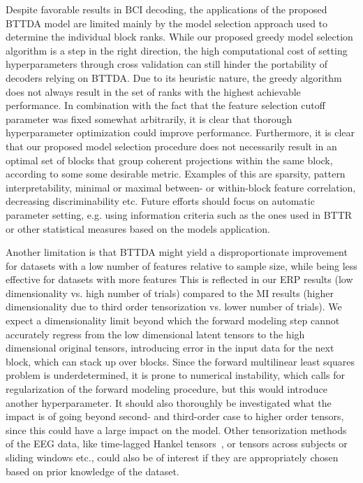 Despite favorable results in BCI decoding, the applications of the proposed
BTTDA model are limited mainly by the model selection approach used
to determine the individual block ranks.
While our proposed greedy model selection algorithm is a step in the right
direction, the high computational cost of setting hyperparameters through cross
validation can still hinder the portability of decoders relying on
BTTDA.
Due to its heuristic nature, the greedy algorithm does not always result in the
set of ranks with the highest achievable performance.
In combination with the fact that the feature selection cutoff parameter was
fixed somewhat arbitrarily, it is clear that thorough
hyperparameter optimization could improve performance.
Furthermore, it is clear that our proposed model selection procedure does not
necessarily result in an optimal set of blocks that group coherent projections
within the same block, according to some some desirable metric.
Examples of this are sparsity, pattern interpretability, minimal or maximal between- or within-block feature
correlation, decreasing discriminability etc.
Future efforts should focus on automatic parameter setting, e.g. using
information criteria such as the ones used in BTTR~\cite{Faes2022} or other
statistical measures based on the models application.

Another limitation is that BTTDA might yield a disproportionate
improvement for datasets with a low number of features relative to sample size,
while being less effective for datasets with more features
This is reflected
in our ERP results (low dimensionality vs. high number of trials) compared to the
MI results (higher dimensionality due to third order tensorization vs. lower
number of trials).
We expect a dimensionality limit beyond which the forward modeling step cannot
accurately regress from the low dimensional latent tensors to the high
dimensional original tensors, introducing
error in the input data for the next block, which can stack up over blocks.
Since the forward multilinear least squares problem is underdetermined, it is prone to
numerical instability, which calls for regularization of the forward modeling
procedure, but this would introduce another hyperparameter.
It should also thoroughly be investigated what the impact is of going beyond
second- and third-order case to higher order tensors, since this could have a large impact
on the model.
Other tensorization methods of the EEG data, like time-lagged Hankel
tensors~\cite{Papy2005}, or tensors across subjects or sliding windows etc., could also be
of interest if they are appropriately chosen based on prior knowledge of the dataset.

